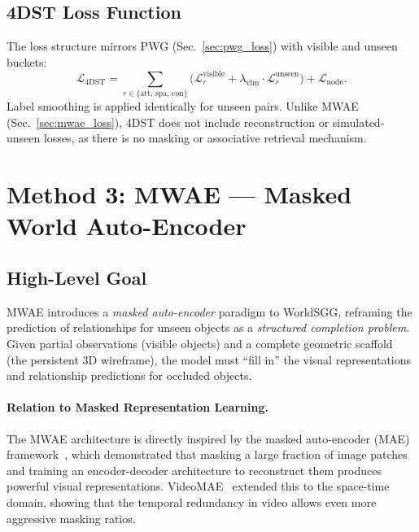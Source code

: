 \documentclass[runningheads]{llncs}
\begin{document}
\subsection{4DST Loss Function}

The loss structure mirrors PWG (Sec.~\ref{sec:pwg_loss}) with visible and unseen buckets:
\begin{equation}
    \mathcal{L}_{\text{4DST}} = \sum_{r \in \{\text{att, spa, con}\}} \bigl(\mathcal{L}_{r}^{\text{visible}} + \lambda_{\text{vlm}} \cdot \mathcal{L}_{r}^{\text{unseen}}\bigr) + \mathcal{L}_{\text{node}}.
    \label{eq:4dst_total}
\end{equation}
Label smoothing is applied identically for unseen pairs.  Unlike MWAE (Sec.~\ref{sec:mwae_loss}), 4DST does not include reconstruction or simulated-unseen losses, as there is no masking or associative retrieval mechanism.


\section{Method 3: MWAE --- Masked World Auto-Encoder}
\label{sec:mwae}

\subsection{High-Level Goal}

MWAE introduces a \emph{masked auto-encoder} paradigm to WorldSGG, reframing the prediction of relationships for unseen objects as a \emph{structured completion problem}.  Given partial observations (visible objects) and a complete geometric scaffold (the persistent 3D wireframe), the model must ``fill in'' the visual representations and relationship predictions for occluded objects.

\paragraph{Relation to Masked Representation Learning.}  The MWAE architecture is directly inspired by the masked auto-encoder (MAE) framework~\cite{he2022masked}, which demonstrated that masking a large fraction of image patches and training an encoder-decoder architecture to reconstruct them produces powerful visual representations.  VideoMAE~\cite{tong2022videomae} extended this to the space-time domain, showing that the temporal redundancy in video allows even more aggressive masking ratios.
\end{document}

